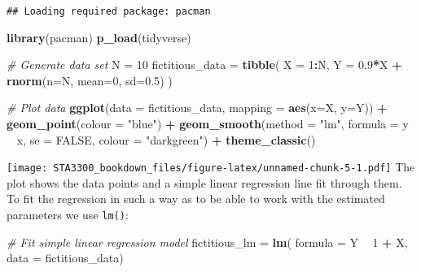 \documentclass[
]{book}
\newenvironment{Shaded}{\begin{snugshade}}{\end{snugshade}}
\newcommand{\CommentTok}[1]{\textcolor[rgb]{0.56,0.35,0.01}{\textit{#1}}}
\newcommand{\DataTypeTok}[1]{\textcolor[rgb]{0.13,0.29,0.53}{#1}}
\newcommand{\DecValTok}[1]{\textcolor[rgb]{0.00,0.00,0.81}{#1}}
\newcommand{\FloatTok}[1]{\textcolor[rgb]{0.00,0.00,0.81}{#1}}
\newcommand{\KeywordTok}[1]{\textcolor[rgb]{0.13,0.29,0.53}{\textbf{#1}}}
\newcommand{\NormalTok}[1]{#1}
\newcommand{\OperatorTok}[1]{\textcolor[rgb]{0.81,0.36,0.00}{\textbf{#1}}}
\newcommand{\OtherTok}[1]{\textcolor[rgb]{0.56,0.35,0.01}{#1}}
\newcommand{\StringTok}[1]{\textcolor[rgb]{0.31,0.60,0.02}{#1}}
\begin{document}
\begin{verbatim}
## Loading required package: pacman
\end{verbatim}

\begin{Shaded}
\begin{Highlighting}[]
\KeywordTok{library}\NormalTok{(pacman)}
\KeywordTok{p_load}\NormalTok{(tidyverse)}

\CommentTok{# Generate data set}
\NormalTok{N =}\StringTok{ }\DecValTok{10}
\NormalTok{fictitious_data =}\StringTok{ }\KeywordTok{tibble}\NormalTok{(}
   \DataTypeTok{X =} \DecValTok{1}\OperatorTok{:}\NormalTok{N,}
   \DataTypeTok{Y =} \FloatTok{0.9}\OperatorTok{*}\NormalTok{X }\OperatorTok{+}\StringTok{ }\KeywordTok{rnorm}\NormalTok{(}\DataTypeTok{n=}\NormalTok{N, }\DataTypeTok{mean=}\DecValTok{0}\NormalTok{, }\DataTypeTok{sd=}\FloatTok{0.5}\NormalTok{)}
\NormalTok{)}

\CommentTok{# Plot data}
\KeywordTok{ggplot}\NormalTok{(}\DataTypeTok{data =}\NormalTok{ fictitious_data,}
       \DataTypeTok{mapping =} \KeywordTok{aes}\NormalTok{(}\DataTypeTok{x=}\NormalTok{X, }\DataTypeTok{y=}\NormalTok{Y)) }\OperatorTok{+}
\StringTok{   }\KeywordTok{geom_point}\NormalTok{(}\DataTypeTok{colour =} \StringTok{"blue"}\NormalTok{) }\OperatorTok{+}
\StringTok{   }\KeywordTok{geom_smooth}\NormalTok{(}\DataTypeTok{method =} \StringTok{"lm"}\NormalTok{,}
               \DataTypeTok{formula =}\NormalTok{ y }\OperatorTok{~}\StringTok{ }\NormalTok{x,}
               \DataTypeTok{se =} \OtherTok{FALSE}\NormalTok{,}
               \DataTypeTok{colour =} \StringTok{"darkgreen"}\NormalTok{) }\OperatorTok{+}
\StringTok{   }\KeywordTok{theme_classic}\NormalTok{()}
\end{Highlighting}
\end{Shaded}

\texttt{[image: STA3300\_bookdown\_files/figure-latex/unnamed-chunk-5-1.pdf]}
The plot shows the data points and a simple linear regression line fit through them. To fit the regression in such a way as to be able to work with the estimated parameters we use \texttt{lm()}:

\begin{Shaded}
\begin{Highlighting}[]
\CommentTok{# Fit simple linear regression model}
\NormalTok{fictitious_lm =}\StringTok{ }\KeywordTok{lm}\NormalTok{(}
   \DataTypeTok{formula =}\NormalTok{ Y }\OperatorTok{~}\StringTok{ }\DecValTok{1} \OperatorTok{+}\StringTok{ }\NormalTok{X,}
   \DataTypeTok{data =}\NormalTok{ fictitious_data)}
\end{Highlighting}
\end{Shaded}
\end{document}
